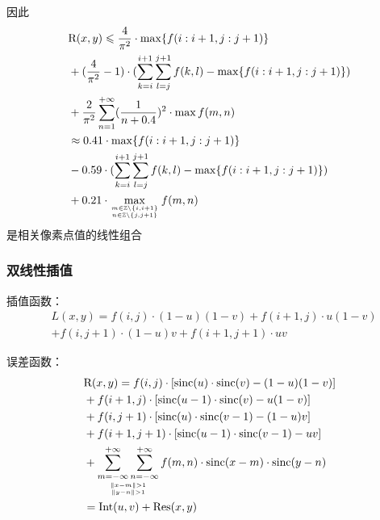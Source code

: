\documentclass{article}
\begin{document}
因此
\begin{equation}
	\begin{aligned}
		& \mathrm{R}(x,y) \leqslant \frac{4}{\pi^2} \cdot \max\{f(i:i+1, j:j+1)\} \\
		& + (\frac{4}{\pi^2} - 1)\cdot(\sum_{k=i}^{i+1}\sum_{l=j}^{j+1} f(k,l)- \max\{f(i:i+1, j:j+1)\})\\
		& + \frac{2}{\pi^2}\sum_{n = 1}^{+\infty}(\frac{1}{n+0.4})^2 \cdot \max{f(m,n)}\\
		& \approx 0.41 \cdot \max\{f(i:i+1, j:j+1)\}\\ 
		& - 0.59 \cdot (\sum_{k=i}^{i+1}\sum_{l=j}^{j+1} f(k,l)- \max\{f(i:i+1, j:j+1)\})\\ 
		& + 0.21 \cdot \max_{m\in\mathbb{Z}\backslash\{i,i+1\}\atop n\in\mathbb{Z}\backslash\{j,j+1\}}{f(m,n)}
\end{aligned}
\end{equation}
是相关像素点值的线性组合

\subsubsection{双线性插值}
插值函数：
\begin{equation}
	\begin{aligned}
	& L(x,y) = f(i,j)\cdot (1-u)(1-v) + f(i+1,j)\cdot u(1-v) \\
	& + f(i,j+1)\cdot (1-u)v + f(i+1,j+1)\cdot uv
	\end{aligned}
\end{equation}

误差函数：
\begin{equation}
	\begin{aligned}
		& \mathrm{R}(x,y) = f(i,j) \cdot [ \mathrm{sinc}(u) \cdot \mathrm{sinc}(v) - (1-u)(1-v)] \\
		& + f(i+1,j) \cdot [ \mathrm{sinc}(u-1) \cdot \mathrm{sinc}(v) - u(1-v)]\\ 
		& + f(i,j+1) \cdot [ \mathrm{sinc}(u) \cdot \mathrm{sinc}(v-1) - (1-u)v]\\ 
		& + f(i+1,j+1) \cdot [ \mathrm{sinc}(u-1) \cdot \mathrm{sinc}(v-1) - uv]\\ 
		& + \mathop{\sum_{m=-\infty}^{+\infty}\sum_{n=-\infty}^{+\infty}}_{\|x-m\|>1\atop \|y-n\|>1} f(m,n)\cdot \mathrm{sinc}(x-m)\cdot \mathrm{sinc}(y-n)\\
		& = \mathrm{Int}(u,v) + \mathrm{Res}(x,y)
	\end{aligned}
\end{equation}
\end{document}
